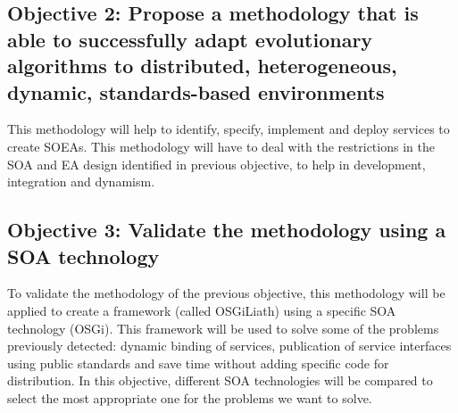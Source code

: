 \newcommand{\objectivemethodology}{Propose a methodology that is able to successfully adapt evolutionary algorithms to distributed, heterogeneous, dynamic, standards-based environments}
\subsection*{Objective 2: \objectivemethodology} 
\label{subsec:intro:obj:methodology}
This methodology will help to identify, specify, implement and deploy services to create SOEAs. This methodology will have to deal with the restrictions in the SOA and EA design identified in previous objective, to help in development, integration and dynamism.

\newcommand{\objectiveframework}{Validate the methodology using a SOA technology}
\subsection*{Objective 3: \objectiveframework}
\label{subsec:intro:obj:fwork}
To validate the methodology of the previous objective, this methodology will be applied to create a framework (called OSGiLiath) using a specific SOA technology (OSGi). This framework will be used to solve some of the problems previously detected: dynamic binding of services, publication of service interfaces using public standards and save time without adding specific code for distribution. In this objective, different SOA technologies will be compared to select the most appropriate one for the problems we want to solve.



